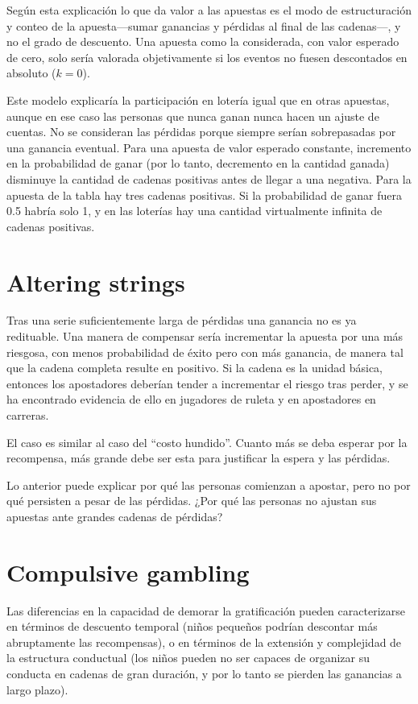 \documentclass[a4paper,12pt]{article}
\begin{document}
Según esta explicación lo que da valor a las apuestas es el modo de estructuración y conteo de la apuesta---sumar ganancias y pérdidas al final de las cadenas---, y no el grado de descuento. Una apuesta como la considerada, con valor esperado de cero, solo sería valorada objetivamente si los eventos no fuesen descontados en absoluto ($k = 0$).

Este modelo explicaría la participación en lotería igual que en otras apuestas, aunque en ese caso las personas que nunca ganan nunca hacen un ajuste de cuentas. No se consideran las pérdidas porque siempre serían sobrepasadas por una ganancia eventual. Para una apuesta de valor esperado constante, incremento en la probabilidad de ganar (por lo tanto, decremento en la cantidad ganada) disminuye la cantidad de cadenas positivas antes de llegar a una negativa. Para la apuesta de la tabla hay tres cadenas positivas. Si la probabilidad de ganar fuera 0.5 habría solo 1, y en las loterías hay una cantidad virtualmente infinita de cadenas positivas.

\section{Altering strings}

Tras una serie suficientemente larga de pérdidas una ganancia no es ya redituable. Una manera de compensar sería incrementar la apuesta por una más riesgosa, con menos probabilidad de éxito pero con más ganancia, de manera tal que la cadena completa resulte en positivo. Si la cadena es la unidad básica, entonces los apostadores deberían tender a incrementar el riesgo tras perder, y se ha encontrado evidencia de ello en jugadores de ruleta y en apostadores en carreras.

El caso es similar al caso del ``costo hundido''. Cuanto más se deba esperar por la recompensa, más grande debe ser esta para justificar la espera y las pérdidas.

Lo anterior puede explicar por qué las personas comienzan a apostar, pero no por qué persisten a pesar de las pérdidas. ¿Por qué las personas no ajustan sus apuestas ante grandes cadenas de pérdidas?

\section{Compulsive gambling}

Las diferencias en la capacidad de demorar la gratificación pueden caracterizarse en términos de descuento temporal (niños pequeños podrían descontar más abruptamente las recompensas), o en términos de la extensión y complejidad de la estructura conductual (los niños pueden no ser capaces de organizar su conducta en cadenas de gran duración, y por lo tanto se pierden las ganancias a largo plazo).
\end{document}
